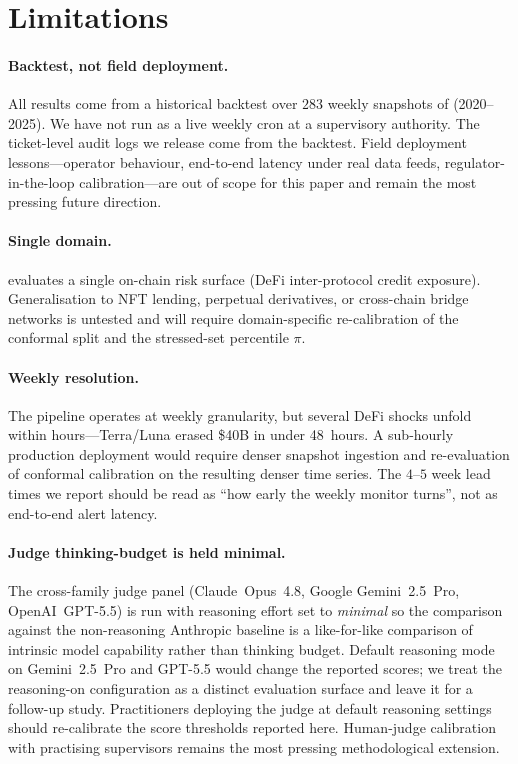 \section*{Limitations}
\label{sec:limitations}

\paragraph{Backtest, not field deployment.}
All results come from a historical backtest over $283$ weekly
snapshots of \corpusname{} (2020--2025). We have not run
\sysname{} as a live weekly cron at a supervisory authority. The
ticket-level audit logs we release come from the backtest. Field
deployment lessons---operator behaviour, end-to-end latency under
real data feeds, regulator-in-the-loop calibration---are out of
scope for this paper and remain the most pressing future direction.

\paragraph{Single domain.}
\benchname{} evaluates a single on-chain risk surface (DeFi
inter-protocol credit exposure). Generalisation to NFT lending,
perpetual derivatives, or cross-chain bridge networks is untested
and will require domain-specific re-calibration of the conformal
split and the stressed-set percentile $\pi$.

\paragraph{Weekly resolution.}
The pipeline operates at weekly granularity, but several DeFi shocks
unfold within hours---Terra/Luna erased \$40B in under 48~hours. A
sub-hourly production deployment would require denser snapshot
ingestion and re-evaluation of conformal calibration on the
resulting denser time series. The $4$--$5$ week lead times we
report should be read as ``how early the weekly monitor turns'',
not as end-to-end alert latency.

\paragraph{Judge thinking-budget is held minimal.}
The cross-family judge panel (Claude~Opus~4.8, Google
Gemini~2.5~Pro, OpenAI~GPT-5.5) is run with reasoning effort set
to \emph{minimal} so the comparison against the
non-reasoning Anthropic baseline is a like-for-like comparison of
intrinsic model capability rather than thinking budget. Default
reasoning mode on Gemini~2.5~Pro and GPT-5.5 would change the
reported scores; we treat the reasoning-on configuration as a
distinct evaluation surface and leave it for a follow-up study.
Practitioners deploying the judge at default reasoning settings
should re-calibrate the score thresholds reported here. Human-judge
calibration with practising supervisors remains the most pressing
methodological extension.

